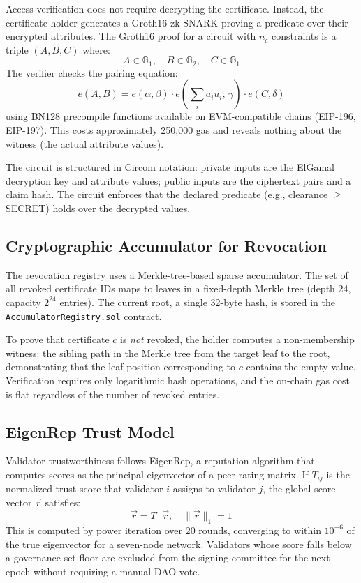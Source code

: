 \documentclass[12pt,a4paper]{article}
\begin{document}
Access verification does not require decrypting the certificate. Instead, the certificate holder generates a Groth16 zk-SNARK proving a predicate over their encrypted attributes. The Groth16 proof for a circuit with $n_c$ constraints is a triple $(A, B, C)$ where:
\[
  A \in \mathbb{G}_1, \quad B \in \mathbb{G}_2, \quad C \in \mathbb{G}_1
\]
The verifier checks the pairing equation:
\[
  e(A, B) = e(\alpha, \beta) \cdot e\!\left(\sum_{i} a_i u_i,\, \gamma\right) \cdot e(C, \delta)
\]
using BN128 precompile functions available on EVM-compatible chains (EIP-196, EIP-197). This costs approximately 250,000 gas and reveals nothing about the witness (the actual attribute values).

The circuit is structured in Circom notation: private inputs are the ElGamal decryption key and attribute values; public inputs are the ciphertext pairs and a claim hash. The circuit enforces that the declared predicate (e.g., clearance $\geq$ SECRET) holds over the decrypted values.

\subsection{Cryptographic Accumulator for Revocation}

The revocation registry uses a Merkle-tree-based sparse accumulator. The set of all revoked certificate IDs maps to leaves in a fixed-depth Merkle tree (depth 24, capacity $2^{24}$ entries). The current root, a single 32-byte hash, is stored in the \texttt{AccumulatorRegistry.sol} contract.

To prove that certificate $c$ is \textit{not} revoked, the holder computes a non-membership witness: the sibling path in the Merkle tree from the target leaf to the root, demonstrating that the leaf position corresponding to $c$ contains the empty value. Verification requires only logarithmic hash operations, and the on-chain gas cost is flat regardless of the number of revoked entries.

\subsection{EigenRep Trust Model}

Validator trustworthiness follows EigenRep, a reputation algorithm that computes scores as the principal eigenvector of a peer rating matrix. If $T_{ij}$ is the normalized trust score that validator $i$ assigns to validator $j$, the global score vector $\vec{r}$ satisfies:
\[
  \vec{r} = T^{\top} \vec{r}, \quad \|\vec{r}\|_1 = 1
\]
This is computed by power iteration over 20 rounds, converging to within $10^{-6}$ of the true eigenvector for a seven-node network. Validators whose score falls below a governance-set floor are excluded from the signing committee for the next epoch without requiring a manual DAO vote.
\end{document}
